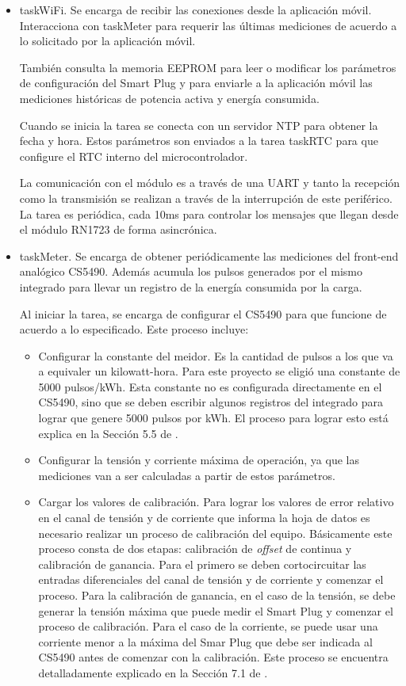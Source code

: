 \begin{itemize}
\item taskWiFi. Se encarga de recibir las conexiones desde la aplicación móvil. Interacciona con taskMeter para requerir las últimas mediciones de acuerdo a lo solicitado por la aplicación móvil.

También consulta la memoria EEPROM para leer o modificar los parámetros de configuración del Smart Plug y para enviarle a la aplicación móvil las mediciones históricas de potencia activa y energía consumida.

Cuando se inicia la tarea se conecta con un servidor NTP para obtener la fecha y hora. Estos parámetros son enviados a la tarea taskRTC para que configure el RTC interno del microcontrolador.

La comunicación con el módulo es a través de una UART y tanto la recepción como la transmisión se realizan a través de la interrupción de este periférico. La tarea es periódica, cada 10ms para controlar los mensajes que llegan desde el módulo RN1723  de forma asincrónica.

\item taskMeter. Se encarga de obtener periódicamente las mediciones del front-end analógico CS5490. Además acumula los pulsos generados por el mismo integrado para llevar un registro de la energía consumida por la carga.

Al iniciar la tarea, se encarga de configurar el CS5490 para que funcione de acuerdo a lo especificado. Este proceso incluye:

\begin{itemize}
\item Configurar la constante del meidor. Es la cantidad de pulsos a los que va a equivaler un kilowatt-hora. Para este proyecto se eligió una constante de 5000 pulsos/kWh. Esta constante no es configurada directamente en el CS5490, sino que se deben escribir algunos registros del integrado para lograr que genere 5000 pulsos por kWh. El proceso para lograr esto está explica en la Sección 5.5 de \citep{datasheet_CS5490}.
\item Configurar la tensión y corriente máxima de operación, ya que las mediciones van a ser calculadas a partir de estos parámetros.
\item Cargar los valores de calibración. Para lograr los valores de error relativo en el canal de tensión y de corriente que informa la hoja de datos es necesario realizar un proceso de calibración del equipo. Básicamente este proceso consta de dos etapas: calibración de \textit{offset} de continua y calibración de ganancia. Para el primero se deben cortocircuitar las entradas diferenciales del canal de tensión y de corriente y comenzar el proceso. Para la calibración de ganancia, en el caso de la tensión, se debe generar la tensión máxima que puede medir el Smart Plug y comenzar el proceso de calibración. Para el caso de la corriente, se puede usar una corriente menor a la máxima del Smar Plug que debe ser indicada al CS5490 antes de comenzar con la calibración.
Este proceso se encuentra detalladamente explicado en la Sección 7.1 de \citep{datasheet_CS5490}.


\end{itemize}
\end{itemize}
